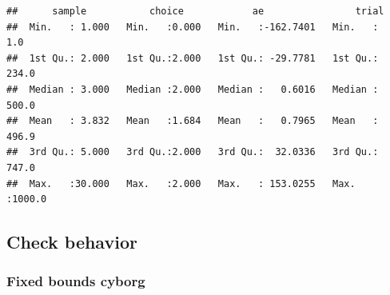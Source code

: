 \documentclass[
]{book}
\newenvironment{Shaded}{\begin{snugshade}}{\end{snugshade}}
\newcommand{\AttributeTok}[1]{\textcolor[rgb]{0.13,0.29,0.53}{#1}}
\newcommand{\CommentTok}[1]{\textcolor[rgb]{0.56,0.35,0.01}{\textit{#1}}}
\newcommand{\ControlFlowTok}[1]{\textcolor[rgb]{0.13,0.29,0.53}{\textbf{#1}}}
\newcommand{\DecValTok}[1]{\textcolor[rgb]{0.00,0.00,0.81}{#1}}
\newcommand{\FunctionTok}[1]{\textcolor[rgb]{0.13,0.29,0.53}{\textbf{#1}}}
\newcommand{\NormalTok}[1]{#1}
\newcommand{\OtherTok}[1]{\textcolor[rgb]{0.56,0.35,0.01}{#1}}
\newcommand{\SpecialCharTok}[1]{\textcolor[rgb]{0.81,0.36,0.00}{\textbf{#1}}}
\begin{document}
\begin{Shaded}
\end{Shaded}

\begin{verbatim}
##      sample           choice            ae                trial       
##  Min.   : 1.000   Min.   :0.000   Min.   :-162.7401   Min.   :   1.0  
##  1st Qu.: 2.000   1st Qu.:2.000   1st Qu.: -29.7781   1st Qu.: 234.0  
##  Median : 3.000   Median :2.000   Median :   0.6016   Median : 500.0  
##  Mean   : 3.832   Mean   :1.684   Mean   :   0.7965   Mean   : 496.9  
##  3rd Qu.: 5.000   3rd Qu.:2.000   3rd Qu.:  32.0336   3rd Qu.: 747.0  
##  Max.   :30.000   Max.   :2.000   Max.   : 153.0255   Max.   :1000.0
\end{verbatim}

\hypertarget{check-behavior}{%
\subsection{Check behavior}\label{check-behavior}}

\hypertarget{fixed-bounds-cyborg-1}{%
\subsubsection*{Fixed bounds cyborg}\label{fixed-bounds-cyborg-1}}
\end{document}
